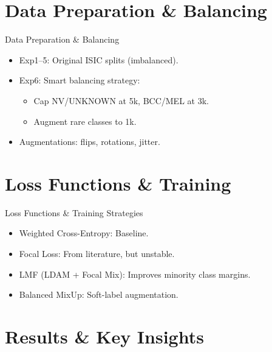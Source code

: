 \documentclass[aspectratio=169]{beamer}
\begin{document}
\section{Data Preparation \& Balancing}

\begin{frame}{Data Preparation \& Balancing}
  \begin{itemize}
    \item Exp1--5: Original ISIC splits (imbalanced).
    \item Exp6: Smart balancing strategy:
      \begin{itemize}
        \item Cap NV/UNKNOWN at 5k, BCC/MEL at 3k.
        \item Augment rare classes to 1k.
      \end{itemize}
    \item Augmentations: flips, rotations, jitter.
  \end{itemize}
  \vspace{0.5em}
\end{frame}


\section{Loss Functions \& Training}

\begin{frame}{Loss Functions \& Training Strategies}
  \begin{itemize}
    \item Weighted Cross-Entropy: Baseline.
    \item Focal Loss: From literature, but unstable.
    \item LMF (LDAM + Focal Mix): Improves minority class margins.
    \item Balanced MixUp: Soft-label augmentation.
  \end{itemize}
  \vspace{0.5em}
\end{frame}


\section{Results \& Key Insights}
\end{document}
